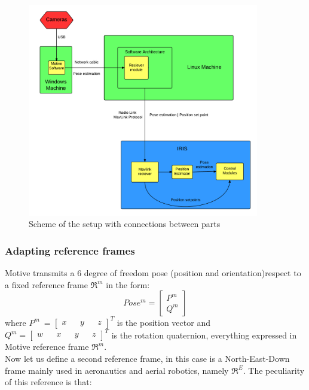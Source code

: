 \begin{figure}[h]
\centering
 \includegraphics[width=0.9\textwidth]{integration.png}
 \caption[Setup scheme]{Scheme of the setup with connections between parts}
 \label{figure:integration}
\end{figure}

\subsubsection{Adapting reference frames}
\label{sec:adaptframes}
Motive transmits a 6 degree of freedom pose (position and orientation)respect to a fixed reference frame $\Re^m$ in the form:\\ 
\begin{equation}
Pose^m = \begin{bmatrix}
P^m\\
Q^m
\end{bmatrix}
\end{equation}
 where $P^m\ = \begin{bmatrix}x&&y&&z\end{bmatrix}^T$ is the position vector and $Q^m =\begin{bmatrix}w&&x&&y&&z\end{bmatrix}^T$ is the rotation quaternion, everything expressed in Motive reference frame $\Re^m$. \\
 
 \noindent
Now let us define a second reference frame, in this case is a North-East-Down frame \cite{FrameRef}  mainly used in aeronautics and aerial robotics, namely  $\Re^E$. The peculiarity of this reference is that:

